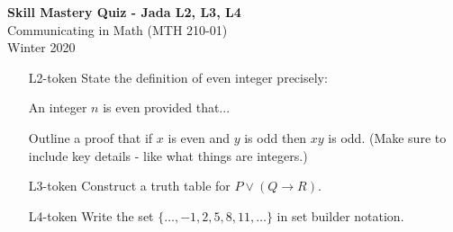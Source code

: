 \documentclass[10pt]{article}
\begin{document}
\vspace{-1.2in}
\begin{center} \textbf{\Large{Skill Mastery Quiz - Jada L2, L3, L4}} \\
Communicating in Math (MTH 210-01)\\
Winter 2020
\end{center}






\begin{itemize}
	
\item[L2-token] State the definition of even integer precisely:

An integer $n$ is even provided that...



\vfill
Outline a proof that if $x$ is even and $y$ is odd then $xy$ is odd. (Make sure to include key details - like what things are integers.)
 

\vfill
\vfill
\vfill
\vfill

\newpage

\item[L3-token] 	Construct a truth table for $P\vee (Q\rightarrow R)$.


\vfill

\item[L4-token] Write the set $\{\dots, -1, 2, 5, 8, 11,\dots\}$ in set builder notation.
\vspace{2in}
\end{itemize}
	
\end{document}

